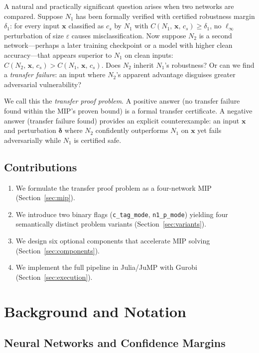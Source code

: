 \documentclass[11pt,a4paper]{article}
\theoremstyle{definition}
\theoremstyle{plain}
\newcommand{\Conf}[3]{C(#1,\,#2,\,#3)}
\newcommand{\NN}[1]{N_{#1}}
\newcommand{\vx}{\mathbf{x}}
\newcommand{\ve}{\boldsymbol{\delta}}
\newcommand{\eps}{\varepsilon}
\newcommand{\deltaone}{\delta_1}
\begin{document}
A natural and practically significant question arises when two networks are compared. Suppose $\NN{1}$ has been formally verified with certified robustness margin $\deltaone$: for every input $\vx$ classified as $c_s$ by $\NN{1}$ with $\Conf{\NN{1}}{\vx}{c_s} \ge \deltaone$, no $\ell_\infty$ perturbation of size $\eps$ causes misclassification. Now suppose $\NN{2}$ is a second network---perhaps a later training checkpoint or a model with higher clean accuracy---that appears superior to $\NN{1}$ on clean inputs: $\Conf{\NN{2}}{\vx}{c_s} > \Conf{\NN{1}}{\vx}{c_s}$. Does $\NN{2}$ inherit $\NN{1}$'s robustness? Or can we find a \emph{transfer failure}: an input where $\NN{2}$'s apparent advantage disguises greater adversarial vulnerability?

We call this the \emph{transfer proof problem}. A positive answer (no transfer failure found within the MIP's proven bound) is a formal transfer certificate. A negative answer (transfer failure found) provides an explicit counterexample: an input $\vx$ and perturbation $\ve$ where $\NN{2}$ confidently outperforms $\NN{1}$ on $\vx$ yet fails adversarially while $\NN{1}$ is certified safe.

\subsection{Contributions}

\begin{enumerate}
  \item We formulate the transfer proof problem as a four-network MIP (Section~\ref{sec:mip}).
  \item We introduce two binary flags (\texttt{c\_tag\_mode}, \texttt{n1\_p\_mode}) yielding four semantically distinct problem variants (Section~\ref{sec:variants}).
  \item We design six optional components that accelerate MIP solving (Section~\ref{sec:components}).
  \item We implement the full pipeline in Julia/JuMP with Gurobi (Section~\ref{sec:execution}).
\end{enumerate}

\section{Background and Notation}

\subsection{Neural Networks and Confidence Margins}
\end{document}
